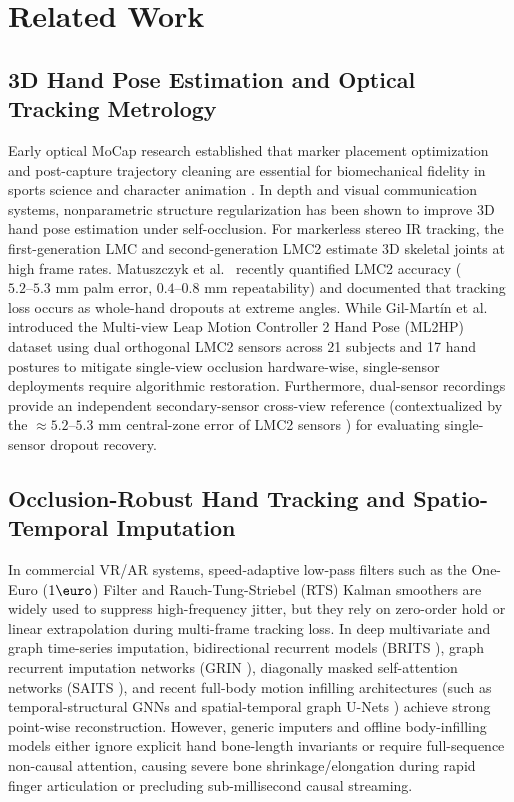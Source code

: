 \documentclass[10pt,twocolumn]{article}
\begin{document}
\section{Related Work}

\subsection{3D Hand Pose Estimation and Optical Tracking Metrology}
Early optical MoCap research established that marker placement optimization and post-capture trajectory cleaning are essential for biomechanical fidelity in sports science and character animation \cite{bregler2007motion,tirakoat2011optimized,noiumkar2013use}. In depth and visual communication systems, nonparametric structure regularization \cite{chen2018nonparametric} has been shown to improve 3D hand pose estimation under self-occlusion. For markerless stereo IR tracking, the first-generation LMC \cite{marin2016hand,boulahia2017dynamic} and second-generation LMC2 \cite{gilmartin2024dual,matuszczyk2025comparative} estimate 3D skeletal joints at high frame rates. Matuszczyk et al.\ \cite{matuszczyk2025comparative} recently quantified LMC2 accuracy ($5.2\text{--}5.3\text{ mm}$ palm error, $0.4\text{--}0.8\text{ mm}$ repeatability) and documented that tracking loss occurs as whole-hand dropouts at extreme angles. While Gil-Mart\'{i}n et al.\ \cite{gilmartin2024dual} introduced the Multi-view Leap Motion Controller 2 Hand Pose (ML2HP) dataset using dual orthogonal LMC2 sensors across 21 subjects and 17 hand postures to mitigate single-view occlusion hardware-wise, single-sensor deployments require algorithmic restoration. Furthermore, dual-sensor recordings provide an independent secondary-sensor cross-view reference (contextualized by the $\approx 5.2\text{--}5.3\text{ mm}$ central-zone error of LMC2 sensors \cite{matuszczyk2025comparative}) for evaluating single-sensor dropout recovery.

\subsection{Occlusion-Robust Hand Tracking and Spatio-Temporal Imputation}
In commercial VR/AR systems, speed-adaptive low-pass filters such as the One-Euro ($1\text{\euro}$) Filter \cite{casiez20121euro} and Rauch-Tung-Striebel (RTS) Kalman smoothers are widely used to suppress high-frequency jitter, but they rely on zero-order hold or linear extrapolation during multi-frame tracking loss. In deep multivariate and graph time-series imputation, bidirectional recurrent models (BRITS \cite{cao2018brits}), graph recurrent imputation networks (GRIN \cite{cini2022filling}), diagonally masked self-attention networks (SAITS \cite{du2023saits}), and recent full-body motion infilling architectures (such as temporal-structural GNNs \cite{nguyen2023reconstructing} and spatial-temporal graph U-Nets \cite{xu2024spatial}) achieve strong point-wise reconstruction. However, generic imputers and offline body-infilling models either ignore explicit hand bone-length invariants or require full-sequence non-causal attention, causing severe bone shrinkage/elongation during rapid finger articulation or precluding sub-millisecond causal streaming.
\end{document}
